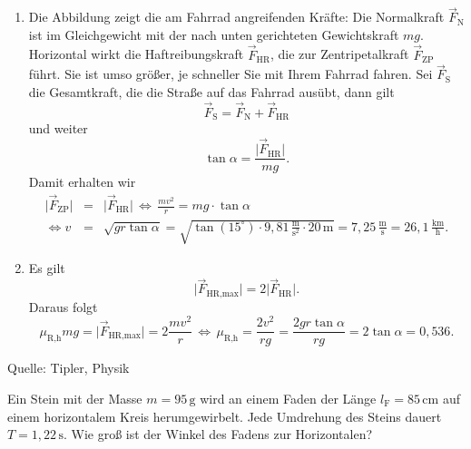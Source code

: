 \begin{MExercises}
\begin{MExercise}
  \begin{MSolution}
  \begin{enumerate}
  \item Die Abbildung zeigt die am Fahrrad angreifenden Kr\"afte: Die Normalkraft $\vec{F}_{\textrm{N}}$ ist im Gleichgewicht mit der nach unten gerichteten Gewichtskraft $mg$. Horizontal wirkt die Haftreibungskraft $\vec{F}_{\textrm{HR}}$, die zur Zentripetalkraft  $\vec{F}_{\textrm{ZP}}$ f\"uhrt. Sie ist umso gr\"o{\ss}er, je schneller Sie mit Ihrem Fahrrad fahren. Sei $\vec{F}_{\textrm{S}}$ die Gesamtkraft, die die Stra{\ss}e auf das Fahrrad aus\"ubt, dann gilt
  $$
  \vec{F}_{\textrm{S}}=\vec{F}_{\textrm{N}}+\vec{F}_{\textrm{HR}}
  $$ und weiter
  $$
  \tan \alpha=\frac{\vert\vec{F}_{\textrm{HR}}\vert}{mg}.
  $$ Damit erhalten wir
  \begin{eqnarray*}
  \vert\vec{F}_{\textrm{ZP}}\vert&=&\vert\vec{F}_{\textrm{HR}}\vert\,\Leftrightarrow\, \frac{mv^2}{r}=mg\cdot\tan \alpha\\
  \Leftrightarrow v&=&\sqrt{gr\tan\alpha }=\sqrt{\tan (15^{\circ})\cdot 9{,}81\,\frac{\text{m}}{\text{s}^2}\cdot 20\,\text{m}}=7{,}25\,\frac{\text{m}}{\text{s}}=26{,}1\,\frac{\text{km}}{\text{h}}.
  \end{eqnarray*}
  \item Es gilt 
  $$
  \vert\vec{F}_{\textrm{HR,max}}\vert=2\vert\vec{F}_{\textrm{HR}}\vert.
  $$ Daraus folgt
  \begin{equation}
  \mu_{\textrm{R,h}}mg=\vert\vec{F}_{\textrm{HR,max}}\vert=2\frac{mv^2}{r}\,\Leftrightarrow\, \mu_{\textrm{R,h}}=\frac{2v^2}{rg}=\frac{2gr\tan \alpha}{rg}=2\tan \alpha=0{,}536.
  \end{equation}
  \end{enumerate}
  \end{MSolution}
  Quelle: Tipler, Physik
  \end{MExercise}
  \begin{MExercise}
  Ein Stein mit der Masse $m= 95\,\text{g}$ wird an einem Faden der L\"ange $l_{\textrm{F}}=85\,\text{cm}$ auf einem horizontalem Kreis herumgewirbelt. Jede Umdrehung des Steins dauert $T=1{,}22\,\text{s}$. Wie gro{\ss} ist der Winkel des Fadens zur Horizontalen?
  
 
  

\end{MExercise}
\end{MExercises}
